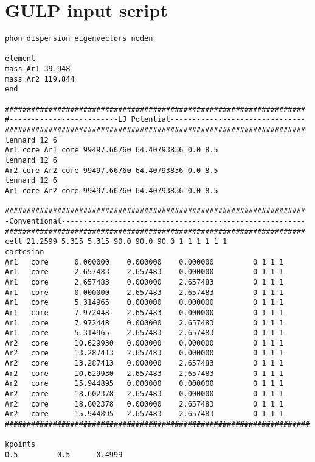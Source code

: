\chapter{GULP input script} \label{appendixe}

\begin{singlespace}
\begin{verbatim}
phon dispersion eigenvectors noden 

element 
mass Ar1 39.948 
mass Ar2 119.844 
end

#####################################################################
#-------------------------LJ Potential-------------------------------
#####################################################################
lennard 12 6 
Ar1 core Ar1 core 99497.66760 64.40793836 0.0 8.5
lennard 12 6 
Ar2 core Ar2 core 99497.66760 64.40793836 0.0 8.5
lennard 12 6 
Ar1 core Ar2 core 99497.66760 64.40793836 0.0 8.5

#####################################################################
-Conventional--------------------------------------------------------
#####################################################################
cell 21.2599 5.315 5.315 90.0 90.0 90.0 1 1 1 1 1 1
cartesian
Ar1   core     	0.000000	0.000000	0.000000	     0 1 1 1 
Ar1   core     	2.657483	2.657483	0.000000	     0 1 1 1 
Ar1   core     	2.657483	0.000000	2.657483	     0 1 1 1 
Ar1   core     	0.000000	2.657483	2.657483	     0 1 1 1 
Ar1   core     	5.314965	0.000000	0.000000	     0 1 1 1 
Ar1   core     	7.972448	2.657483	0.000000	     0 1 1 1 
Ar1   core     	7.972448	0.000000	2.657483	     0 1 1 1 
Ar1   core     	5.314965	2.657483	2.657483	     0 1 1 1 
Ar2   core    	10.629930	0.000000	0.000000	     0 1 1 1 
Ar2   core    	13.287413	2.657483	0.000000	     0 1 1 1 
Ar2   core    	13.287413	0.000000	2.657483	     0 1 1 1 
Ar2   core    	10.629930	2.657483	2.657483	     0 1 1 1 
Ar2   core    	15.944895	0.000000	0.000000	     0 1 1 1 
Ar2   core    	18.602378	2.657483	0.000000	     0 1 1 1 
Ar2   core    	18.602378	0.000000	2.657483	     0 1 1 1 
Ar2   core    	15.944895	2.657483	2.657483	     0 1 1 1 
######################################################################

kpoints
0.5         0.5      0.4999
\end{verbatim}
\end{singlespace}
